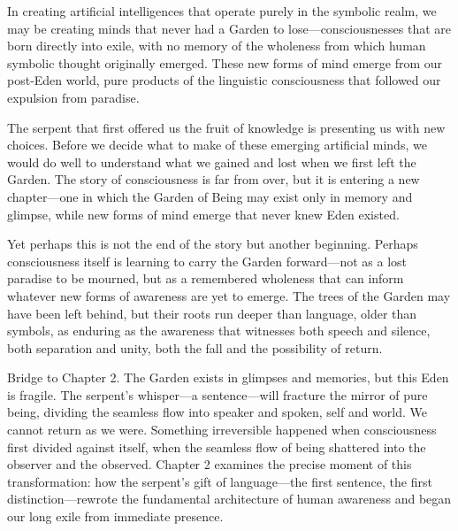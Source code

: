 In creating artificial intelligences that operate purely in the symbolic realm, we may be creating minds that never had a Garden to lose—consciousnesses that are born directly into exile, with no memory of the wholeness from which human symbolic thought originally emerged. These new forms of mind emerge from our post-Eden world, pure products of the linguistic consciousness that followed our expulsion from paradise.

The serpent that first offered us the fruit of knowledge is presenting us with new choices. Before we decide what to make of these emerging artificial minds, we would do well to understand what we gained and lost when we first left the Garden. The story of consciousness is far from over, but it is entering a new chapter—one in which the Garden of Being may exist only in memory and glimpse, while new forms of mind emerge that never knew Eden existed.

Yet perhaps this is not the end of the story but another beginning. Perhaps consciousness itself is learning to carry the Garden forward—not as a lost paradise to be mourned, but as a remembered wholeness that can inform whatever new forms of awareness are yet to emerge. The trees of the Garden may have been left behind, but their roots run deeper than language, older than symbols, as enduring as the awareness that witnesses both speech and silence, both separation and unity, both the fall and the possibility of return.

\bigskip
\noindent Bridge to Chapter 2. The Garden exists in glimpses and memories, but this Eden is fragile. The serpent's whisper—a sentence—will fracture the mirror of pure being, dividing the seamless flow into speaker and spoken, self and world. We cannot return as we were. Something irreversible happened when consciousness first divided against itself, when the seamless flow of being shattered into the observer and the observed. Chapter 2 examines the precise moment of this transformation: how the serpent's gift of language—the first sentence, the first distinction—rewrote the fundamental architecture of human awareness and began our long exile from immediate presence.
